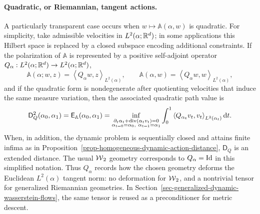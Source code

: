 \paragraph{Quadratic, or Riemannian, tangent actions.}
A particularly transparent case occurs when \(w\mapsto\mathbb A(\alpha,w)\) is quadratic. For simplicity, take admissible velocities in \(L^2(\alpha;\mathbb{R}^d)\); in some applications this Hilbert space is replaced by a closed subspace encoding additional constraints. If the polarization of \(\mathbb A\) is represented by a positive self-adjoint operator
\(Q_\alpha:L^2(\alpha;\mathbb{R}^d)\to L^2(\alpha;\mathbb{R}^d)\),
\[
	\mathbb A(\alpha;w,z)
	=
	\left\langle Q_\alpha w,z\right\rangle_{L^2(\alpha)},
	\qquad
	\mathbb A(\alpha,w)=\left\langle Q_\alpha w,w\right\rangle_{L^2(\alpha)},
\]
	and if the quadratic form is nondegenerate after quotienting velocities that induce the same measure variation, then the associated quadratic path value is
\begin{equation}\label{eq-general-quadratic-tangent-action}
	\mathsf D_Q^2(\alpha_0,\alpha_1)
	=
	\mathsf E_{\mathbb A}(\alpha_0,\alpha_1)
	=
	\inf_{\substack{\partial_t\alpha_t+\operatorname{div}(\alpha_t v_t)=0\\
	\alpha_{t=0}=\alpha_0,\ \alpha_{t=1}=\alpha_1}}
	\int_0^1
	\left\langle Q_{\alpha_t}v_t,v_t\right\rangle_{L^2(\alpha_t)}
	\mathrm{d} t.
\end{equation}
When, in addition, the dynamic problem is sequentially closed and attains finite infima as in Proposition~\ref{prop-homogeneous-dynamic-action-distance}, $\mathsf D_Q$ is an extended distance. The usual $\operatorname{\mathcal{W}}_2$ geometry corresponds to $Q_\alpha=\mathrm{Id}$ in this simplified notation. Thus \(Q_\alpha\) records how the chosen geometry deforms the Euclidean \(L^2(\alpha)\) tangent norm: no deformation for \(\operatorname{\mathcal{W}}_2\), and a nontrivial tensor for generalized Riemannian geometries. In Section~\ref{sec-generalized-dynamic-wasserstein-flows}, the same tensor is reused as a preconditioner for metric descent.

